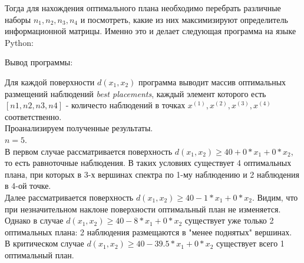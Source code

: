 Тогда для нахождения оптимального плана необходимо перебрать различные наборы $n_1, n_2, n_3, n_4$ и посмотреть, какие из них максимизируют определитель информационной матрицы. Именно это и делает следующая программа на языке Python:



Вывод программы:



Для каждой поверхности $d(x_1, x_2)$ программа выводит массив оптимальных размещений наблюдений \textit{best placements}, каждый элемент которого есть $[n1, n2, n3, n4]$ -  количесто наблюдений в точках $x^{(1)}, x^{(2)}, x^{(3)}, x^{(4)}$ соответственно.\\
Проанализируем полученные результаты.\\
$n = 5$.\\
В первом случае рассматривается поверхность $d(x_1, x_2) \ge 40 + 0*x_1 + 0*x_2$, то есть равноточные наблюдения. В таких условиях существует 4 оптимальных плана, при которых в 3-х вершинах спектра по 1-му наблюдению и 2 наблюдения в 4-ой точке. \\
Далее рассматривается поверхность $d(x_1, x_2) \ge 40 - 1*x_1 + 0*x_2$. Видим, что при незначительном наклоне поверхности оптимальный план не изменяется. \\
Однако в случае $d(x_1, x_2) \ge 40 - 8*x_1 + 0*x_2$ существует уже только 2 оптимальных плана: 2 наблюдения размещаются в "менее поднятых" вершинах.\\
В критическом случае $d(x_1, x_2) \ge 40 - 39.5*x_1 + 0*x_2$ существует всего 1 оптимальный план.